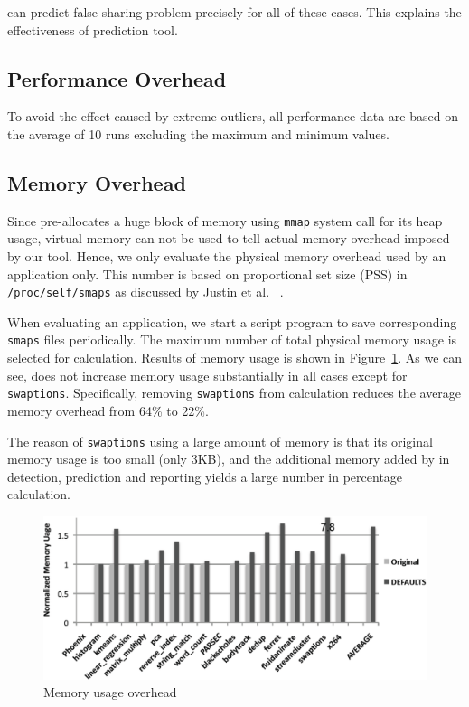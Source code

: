  can predict false sharing problem precisely for all of these cases. This explains
the effectiveness of prediction tool.

\subsection{Performance Overhead}
\label{sec:perfoverhead}
To avoid the effect caused by extreme outliers,
all performance data are based on the average of 10 runs excluding the
maximum and minimum values. 


\subsection{Memory Overhead}
\label{sec:memoverhead}
Since  pre-allocates a huge block of memory using \texttt{mmap} system call for 
its heap usage, 
virtual memory can not be used to tell actual memory overhead imposed by our tool. 
Hence, we only evaluate the physical memory overhead used by an application only. 
This number is based on proportional set size (PSS) in \texttt{/proc/self/smaps}
as discussed by Justin et al. ~\cite{memusage}. 

When evaluating an application, we start a script program to save 
corresponding \texttt{smaps} files periodically. 
The maximum number of total physical memory usage is selected for calculation.
Results of memory usage is shown in Figure~\ref{fig:memusage}. As we can see,
 does not increase memory usage substantially in all cases except for \texttt{swaptions}. 
Specifically, removing \texttt{swaptions} from calculation reduces 
the average memory overhead from 64\% to 22\%. 

The reason of \texttt{swaptions} using a large amount of memory is that 
its original memory usage is too small (only 3KB), and 
the additional memory added by  in detection, prediction and
reporting yields a large number in percentage calculation. 

\begin{figure}
\begin{center} 
\includegraphics[width=5in]{fig/memusage}
\end{center}
\caption{Memory usage overhead}
\label{fig:memusage}
\end{figure}



 


